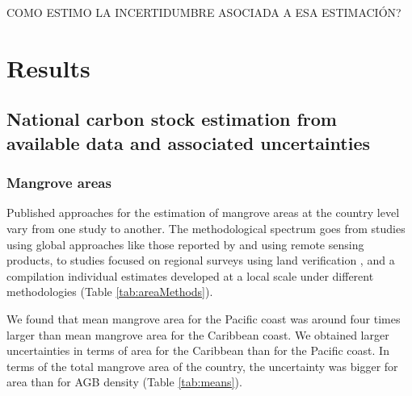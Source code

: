 \documentclass[review, authoryear]{elsarticle}   	%
\begin{document}
COMO ESTIMO LA INCERTIDUMBRE ASOCIADA A ESA ESTIMACIÓN?



\section{Results}

\subsection{National carbon stock estimation from available data and associated uncertainties}
\subsubsection{Mangrove areas}
Published approaches for the estimation of mangrove areas at the country level vary from one study to another. The methodological spectrum goes from studies using global approaches like those reported by  \citet{Giri2013, Giri2010} and  \citet{CONL:CONL12060} using remote sensing products,  to studies focused on regional surveys using land verification  \citep{FAO2007}, and a compilation individual estimates developed at a local scale under different methodologies \citet{INVEMAR2014} (Table \ref{tab:areaMethods}). 

We found that mean mangrove area for the Pacific coast was around four times larger than mean mangrove area for the Caribbean coast. We obtained larger uncertainties in terms of area for the Caribbean than for the Pacific coast. In terms of the total mangrove area of the country, the uncertainty was bigger for area than for AGB density (Table \ref{tab:means}).
\end{document}

